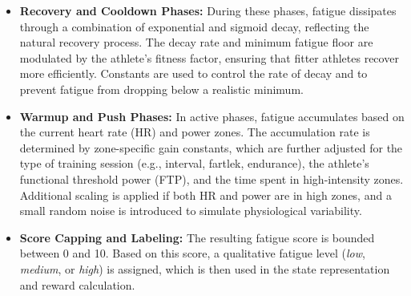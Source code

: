 \begin{itemize}
    \item \textbf{Recovery and Cooldown Phases:} During these phases, fatigue dissipates through a combination of exponential and sigmoid decay, reflecting the natural recovery process. The decay rate and minimum fatigue floor are modulated by the athlete's fitness factor, ensuring that fitter athletes recover more efficiently. Constants are used to control the rate of decay and to prevent fatigue from dropping below a realistic minimum.
    \item \textbf{Warmup and Push Phases:} In active phases, fatigue accumulates based on the current heart rate (HR) and power zones. The accumulation rate is determined by zone-specific gain constants, which are further adjusted for the type of training session (e.g., interval, fartlek, endurance), the athlete's functional threshold power (FTP), and the time spent in high-intensity zones. Additional scaling is applied if both HR and power are in high zones, and a small random noise is introduced to simulate physiological variability.
    \item \textbf{Score Capping and Labeling:} The resulting fatigue score is bounded between 0 and 10. Based on this score, a qualitative fatigue level (\emph{low}, \emph{medium}, or \emph{high}) is assigned, which is then used in the state representation and reward calculation.
\end{itemize}

